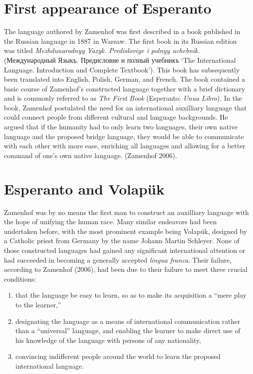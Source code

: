\section{First appearance of Esperanto}
The language authored by Zamenhof was first described in a book published in the Russian language in 1887 in Warsaw.
The first book in its Russian edition was titled \textit{Mezhdunarodnyy Yazyk. Predisloviye i polnyy uchebnik.}
(Между\-на\-род\-ный Языкъ. Предисловие и полный учебникъ `The International Language. Introduction and Complete Textbook').
This book has subsequently been translated into English, Polish, German, and French.
The book contained a basic course of Zamenhof's constructed language together with a brief dictionary and is commonly referred to as \textit{The First Book} (Esperanto: \textit{Unua Libro}).
In the book, Zamenhof postulated the need for an international auxilliary language that could connect people from different cultural and language backgrounds.
He argued that if the humanity had to only learn two languages, their own native language and the proposed bridge language, they would be able to communicate with each other with more ease, enriching all languages and allowing for a better command of one's own native language.
(Zamenhof 2006).

\section{Esperanto and Volapük}
Zamenhof was by no means the first man to construct an auxilliary language with the hope of unifying the human race.
Many similar endeavors had been undertaken before, with the most prominent example being Volapük, designed by a Catholic priest from Germany by the name Johann Martin Schleyer.
None of those constructed languages had gained any significant international attention or had succeeded in becoming a generally accepted \textit{lingua franca}.
Their failure, according to Zamenhof (2006), had been due to their failure to meet three crucial conditions:

\begin{enumerate}
  \item that the language be easy to learn, so as to make its acquisition a ``mere play to the learner,''
  \item designating the language as a means of international communication rather than a ``universal'' language, and enabling the learner to make direct use of his knowledge of the language with persons of any nationality,
  \item convincing indifferent people around the world to learn the proposed international language.
\end{enumerate}

